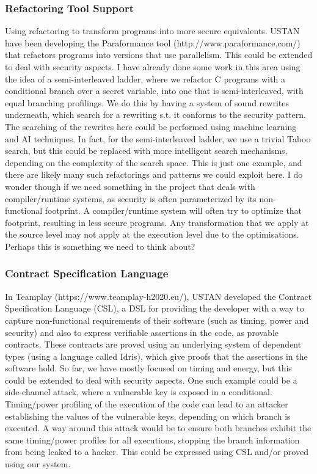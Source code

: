 \documentclass[a4paper,11pt]{article}
\begin{document}
\subsubsection{Refactoring Tool Support}
Using refactoring to transform programs into more secure equivalents. USTAN have been developing the Paraformance tool (http://www.paraformance.com/) that refactors programs into versions that use parallelism. This could be extended to deal with security aspects. I have already done some work in this area using the idea of a semi-interleaved ladder, where we refactor C programs with a conditional branch over a secret variable, into one that is semi-interleaved, with equal branching profilings. We do this by having a system of sound rewrites underneath, which search for a rewriting s.t. it conforms to the security pattern.  The searching of the rewrites here could be performed using machine learning and AI techniques. In fact, for the semi-interleaved ladder, we use a trivial Taboo search, but this could be replaced with more intelligent search mechanisms, depending on the complexity of the search space.  This is just one example, and there are likely many such refactorings and patterns we could exploit here. I do wonder though if we need something in the project that deals with compiler/runtime systems, as security is often parameterized by its non-functional footprint. A compiler/runtime system will often try to optimize that footprint, resulting in less secure programs. Any transformation that we apply at the source level may not apply at the execution level due to the optimisations. Perhaps this is something we need to think about?

\subsubsection{Contract Specification Language}
In Teamplay (https://www.teamplay-h2020.eu/), USTAN developed the Contract Specification Language (CSL), a DSL for providing the developer with a way to capture non-functional requirements of their software (such as timing, power and security) and also to express verifiable assertions in the code, as provable contracts. These contracts are proved using an underlying system of dependent types (using a language called Idris), which give proofs that the assertions in the software hold. So far, we have mostly focused on timing and energy, but this could be extended to deal with security aspects. One such example could be a side-channel attack, where a vulnerable key is exposed in a conditional. Timing/power profiling of the execution of the code can lead to an attacker establishing the values of the vulnerable keys, depending on which branch is executed. A way around this attack would be to ensure both branches exhibit the same timing/power profiles for all executions, stopping the branch information from being leaked to a hacker. This could be expressed using CSL and/or proved using our system.
\end{document}
